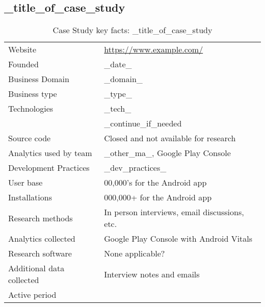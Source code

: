 \subsection{_title_of_case_study}

{\renewcommand{\arraystretch}{0.8}%
\begin{table}[htbp!]
    \centering
    \small
    \setlength{\tabcolsep}{1pt}
    \begin{tabular}{ll}
       \toprule
       Website &\url{https://www.example.com/} \\
       Founded & _date_ \\
       Business Domain & _domain_ \\
       Business type & _type_ \\
       Technologies  & _tech_ \\
       & _continue_if_needed \\
       Source code  &Closed and not available for research \\
       Analytics used by team & _other_ma_, Google Play Console \\
       Development Practices & _dev_practices_ \\
       \midrule
       User base & 00,000's for the Android app \\
       Installations & 000,000+ for the Android app \\
       \midrule
       Research methods &In person interviews, email discussions, etc. \\
       Analytics collected &Google Play Console with Android Vitals \\
       Research software & None applicable? \\
       Additional data collected &Interview notes and emails \\
       Active period & \\
       \bottomrule
    \end{tabular}
    \caption{Case Study key facts: _title_of_case_study}
    \label{tab:blank_case_study_anaytics_overview}
\end{table}
}

